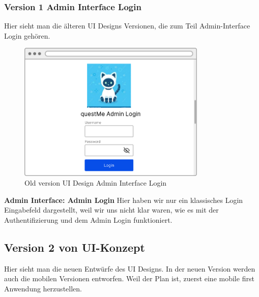 \newpage

\subsubsection{Version 1 Admin Interface Login}
Hier sieht man die älteren UI Designs Versionen, die zum Teil Admin-Interface Login gehören.

\begin{figure}[H]
    \centering
    \includegraphics[width=0.8\textwidth]{bilder/old vers. UI Design/Admin Interface.png}
    \caption{Old version UI Design Admin Interface Login}
    \label{fig:Old version UI Design Admin Interface Login}
    \end{figure}
\noindent \textbf{Admin Interface: Admin Login} \newline
Hier haben wir nur ein klassisches Login Eingabefeld dargestellt, weil wir uns nicht klar waren, wie es mit der Authentifizierung und dem Admin
Login funktioniert.


\newpage

\subsection{Version 2 von UI-Konzept}
Hier sieht man die neuen Entwürfe des UI Designs. In der neuen Version werden auch die 
mobilen Versionen entworfen. Weil der Plan ist, zuerst eine mobile first Anwendung herzustellen.

